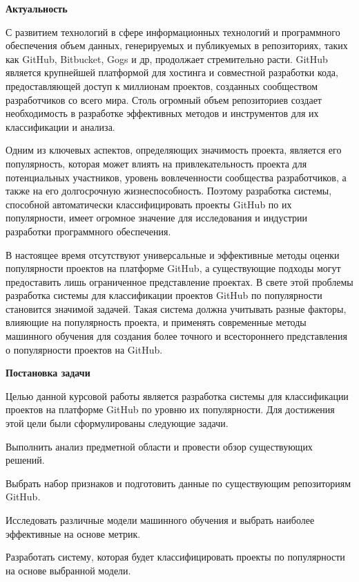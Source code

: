 \newpage
{}

\textbf{Актуальность}

С развитием технологий в сфере информационных технологий и программного обеспечения объем данных, генерируемых и публикуемых в репозиториях, таких как GitHub, Bitbucket, Gogs и др, продолжает стремительно расти. GitHub является крупнейшей платформой для хостинга и совместной разработки кода, предоставляющей доступ к миллионам проектов, созданных сообществом разработчиков со всего мира. Столь огромный объем репозиториев создает необходимость в разработке эффективных методов и инструментов для их классификации и анализа.

Одним из ключевых аспектов, определяющих значимость проекта, является его популярность, которая может влиять на привлекательность проекта для потенциальных участников, уровень вовлеченности сообщества разработчиков, а также на его долгосрочную жизнеспособность. Поэтому разработка системы, способной автоматически классифицировать проекты GitHub по их популярности, имеет огромное значение для исследования и индустрии разработки программного обеспечения.

В настоящее время отсутствуют универсальные и эффективные методы оценки популярности проектов на платформе GitHub, а существующие подходы могут предоставить лишь ограниченное представление проектах. В свете этой проблемы разработка системы для классификации проектов GitHub по популярности становится значимой задачей. Такая система должна учитывать разные факторы, влияющие на популярность проекта, и применять современные методы машинного обучения для создания более точного и всестороннего представления о популярности проектов на GitHub.

\textbf{Постановка задачи}

Целью данной курсовой работы является разработка системы для классификации проектов на платформе GitHub по уровню их популярности. Для достижения этой цели были сформулированы следующие задачи.

\begin{enumerateparendot}
    \item Выполнить анализ предметной области и провести обзор существующих решений.

    \item Выбрать набор признаков и подготовить данные по существующим репозиториям GitHub.

   \item Исследовать различные модели машинного обучения и выбрать наиболее эффективные на основе метрик.

    \item Разработать систему, которая будет классифицировать проекты по популярности на основе выбранной модели.
\end{enumerateparendot}

